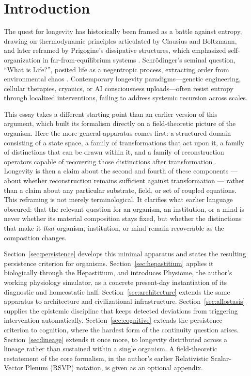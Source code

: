 \documentclass[12pt]{article}
\begin{document}
\section{Introduction}

The quest for longevity has historically been framed as a battle against entropy, drawing on thermodynamic principles articulated by Clausius and Boltzmann, and later reframed by Prigogine's dissipative structures, which emphasized self-organization in far-from-equilibrium systems \cite{prigogine1977}. Schr\"odinger's seminal question, ``What is Life?'', posited life as a negentropic process, extracting order from environmental chaos \cite{schrodinger1944}. Contemporary longevity paradigms---genetic engineering, cellular therapies, cryonics, or AI consciousness uploads---often resist entropy through localized interventions, failing to address systemic recursion across scales.

This essay takes a different starting point than an earlier version of this argument, which built its formalism directly on a field-theoretic picture of the organism. Here the more general apparatus comes first: a structured domain consisting of a state space, a family of transformations that act upon it, a family of distinctions that can be drawn within it, and a family of reconstruction operators capable of recovering those distinctions after transformation \cite{flyxion2026persistence}. Longevity is then a claim about the second and fourth of these components --- about whether reconstruction remains sufficient against transformation --- rather than a claim about any particular substrate, field, or set of coupled equations. This reframing is not merely terminological. It clarifies what earlier language obscured: that the relevant question for an organism, an institution, or a mind is never whether its material composition stays fixed, but whether the distinctions that make it \emph{that} organism, institution, or mind remain recoverable as the composition changes.

Section~\ref{sec:persistence} develops this minimal apparatus and states the resulting persistence criterion for organisms. Section~\ref{sec:hepastitium} applies it biologically through the Hepastitium, and introduces Physiome, the author's working physiology simulator, as a concrete present-day instantiation of its diagnostic and homeostatic half. Section~\ref{sec:architecture} extends the same apparatus to architecture and civilizational infrastructure. Section~\ref{sec:allostasis} supplies the epistemic discipline that keeps detected deviations from triggering intervention automatically. Section~\ref{sec:cognitive} extends the persistence criterion to cognition, where the hardest form of the continuity question arises. Section~\ref{sec:lineage} extends it once more, to longevity distributed across a lineage rather than sustained within a single organism. A field-theoretic restatement of the core formalism, in the author's earlier Relativistic Scalar-Vector Plenum (RSVP) notation, is given as an optional appendix.
\end{document}
